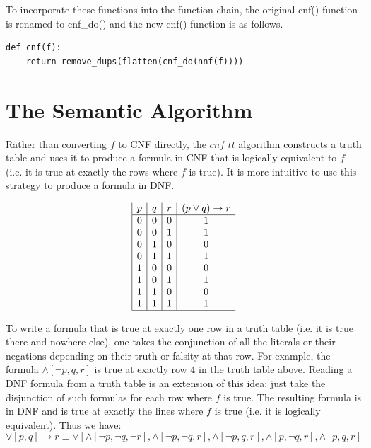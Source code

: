 \documentclass[a4paper,notitlepage]{scrartcl}
\begin{document}
\noindent
To incorporate these functions into the function chain, the original cnf()
function is renamed to cnf\_do() and the new cnf() function is as follows.

\begin{verbatim}
def cnf(f):
    return remove_dups(flatten(cnf_do(nnf(f))))
\end{verbatim}

\section{The Semantic Algorithm}

Rather than converting $f$ to CNF directly, the $cnf\_tt$ algorithm
        constructs a truth table and uses it to produce a formula in CNF
        that is logically equivalent to $f$ (i.e. it is true at exactly
        the rows where $f$ is true). 
It is more intuitive to use this strategy to produce a formula
        in DNF.

\begin{displaymath}
\begin{array}{|c|c|c|c}
   p
 & q
 & r
 & (p\lor{}q)\rightarrow{}r \\
\hline
0 & 0 & 0 & 1 \\
0 & 0 & 1 & 1 \\
0 & 1 & 0 & 0 \\
0 & 1 & 1 & 1 \\
1 & 0 & 0 & 0 \\
1 & 0 & 1 & 1 \\
1 & 1 & 0 & 0 \\
1 & 1 & 1 & 1 \\
\hline
\end{array}
\end{displaymath}

To write a formula that is true at exactly one row in a truth table
        (i.e. it is true there and nowhere else), one 
        takes the conjunction of all the literals or their negations depending
        on their truth or falsity at that row.
For example, the formula $\land [\lnot p, q, r]$ is true at exactly row $4$ in
        the truth table above.
Reading a DNF formula from a truth table is an extension of this idea:
        just take the disjunction of such formulas for each row where $f$
        is true.
The resulting formula is in DNF and is true at exactly the lines where $f$
        is true (i.e. it is logically equivalent).
Thus we have:
\[
\lor[p,q]\rightarrow r \equiv 
\lor [
\land[\lnot p, \lnot q,\lnot r], 
\land[\lnot p,\lnot q,r], 
\land[\lnot p,q,r], 
\land[p,\lnot q,r], 
\land[p,q,r]
     ]
\]
        
\end{document}
